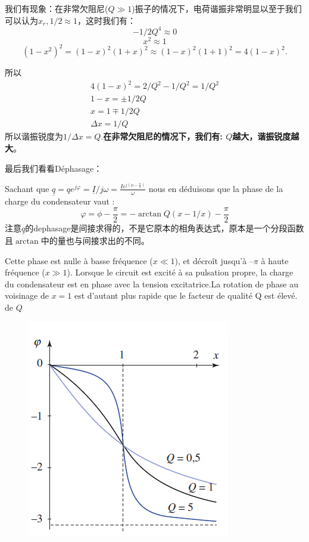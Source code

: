 \documentclass[12pt]{book}
\theoremstyle{definition}\newtheorem{dfn}{Définition}[chapter]
\theoremstyle{plain}\newtheorem{thm}{Théorème}[chapter]
\theoremstyle{plain}\newtheorem{prp}{Proposition}[chapter]
\theoremstyle{plain}\newtheorem{lem}{\bf Lemme}[chapter]
\theoremstyle{plain}\newtheorem{axm}{\bf Axiome}[chapter]
\theoremstyle{plain}\newtheorem{lmm}{\bf Lemme}[chapter]
\theoremstyle{plain}\newtheorem{cor}{\bf Corollaire}[chapter]
\theoremstyle{remark}\newtheorem{rem}{Remarque}[chapter]
\begin{document}
我们有现象：在非常欠阻尼($Q\gg 1$)振子的情况下，电荷谐振非常明显以至于我们可以认为$x_r,1/2\approx 1$，这时我们有：
$$-1/2Q^4\approx0$$
$$x^2\approx1$$
$$
(1-x^2)^2=(1-x)^2(1+x)^2\approx(1-x)^2(1+1)^2=4(1-x)^2
.$$

所以
$$
\begin{aligned}
4(1-x)^2=2/Q^2-1/Q^2=1/Q^2\\
1-x=\pm1/2Q\\
x=1\mp1/2Q\\
\Delta x=1/Q
\end{aligned}
$$
所以谐振锐度为$1/\Delta x=Q$.\textbf{在非常欠阻尼的情况下，我们有: $Q$越大，谐振锐度越大}。

最后我们看看Déphasage：

Sachant que $\underline{q}=qe^{j\varphi}=\underline{I}/j\omega=\frac{Ie^{j(\phi-\frac{\pi}{2})}}{\omega}$
nous en déduisons que la
phase de la charge du condensateur vaut :
$$
\varphi=\phi-\frac{\pi}{2}=-\arctan{Q(x-1/x)}-\frac{\pi}{2}
$$
注意$\underline{q}$的dephasage是间接求得的，不是它原本的相角表达式，原本是一个分段函数且$\arctan$中的量也与间接求出的不同。

Cette phase est nulle à basse fréquence ($x\ll1$), et décroît jusqu’à $–\pi$ à haute
fréquence ($x\gg1$). Lorsque le circuit est excité à sa pulsation propre, la charge du condensateur est en phase avec la tension excitatrice.La rotation de phase au voisinage de $x=1$ est d’autant plus rapide que le facteur de qualité Q est élevé.
de $Q$

\begin{figure}[H]
	\centering
	\includegraphics[scale=0.8]{image//Etude du circuit RLC serie-Resonances//9}
\end{figure}
\end{document}
